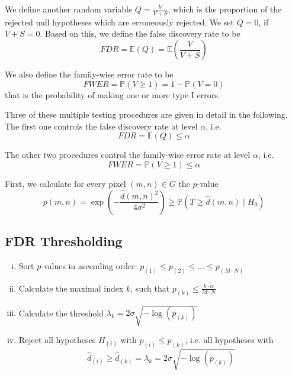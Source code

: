 \documentclass[a4paper,12pt]{article}
\theoremstyle{plain}
\theoremstyle{definition}
\theoremstyle{remark}
\begin{document}
We define another random variable $Q = \frac{V}{V + S}$, which is the proportion of the rejected null hypotheses which are erroneously rejected. We set $Q = 0$, if $V + S = 0$. Based on this, we define the false discovery rate to be
\begin{equation}
	FDR = \mathbb{E}(Q) = \mathbb{E} \left( \frac{V}{V + S} \right)
\end{equation}

We also define the family-wise error rate to be
\begin{equation}
	FWER = \mathbb{P}( V \geq 1 ) = 1 - \mathbb{P}( V = 0 )
\end{equation}
that is the probability of making one or more type I errors.

Three of these multiple testing procedures are given in detail in the following. The first one controls the false discovery rate at level $\alpha$, i.e.
\begin{equation}
	FDR = \mathbb{E}(Q) \leq \alpha
\end{equation}

The other two procedures control the family-wise error rate at level $\alpha$, i.e.
\begin{equation}
	FWER = \mathbb{P}( V \geq 1 ) \leq \alpha
\end{equation}

First, we calculate for every pixel $(m, n) \in G$ the $p$-value
\begin{equation}
	p(m, n) = \exp \left( - \frac{\hat{d}(m, n)^2}{4 \sigma^2} \right) \geq \mathbb{P}(T \geq \hat{d}(m, n) \mid H_0)
\end{equation}

\subsection{FDR Thresholding}
\begin{enumerate}[(i)]
	\item Sort $p$-values in ascending order: $p_{(1)} \leq p_{(2)} \leq \dots \leq p_{(M \cdot N)}$
	\item Calculate the maximal index $k$, such that $p_{(k)} \leq \frac{k \cdot \alpha}{M \cdot N}$
	\item Calculate the threshold $\lambda_{k} = 2 \sigma \sqrt{- \log(p_{(k)})}$
	\item Reject all hypotheses $H_{(i)}$ with $p_{(i)} \leq p_{(k)}$, i.e. all hypotheses with $$\hat{d}_{(i)} \geq \hat{d}_{(k)} = \lambda_{k} = 2 \sigma \sqrt{- \log(p_{(k)})}$$
\end{enumerate}
\end{document}
